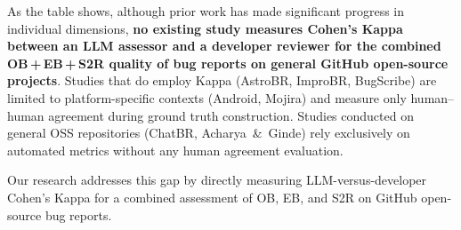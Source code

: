 As the table shows, although prior work has made significant progress
in individual dimensions, \textbf{no existing study measures Cohen's
Kappa between an LLM assessor and a developer reviewer for the
combined OB\,+\,EB\,+\,S2R quality of bug reports on general GitHub
open-source projects}.  Studies that do employ Kappa (AstroBR,
ImproBR, BugScribe) are limited to platform-specific contexts
(Android, Mojira) and measure only human--human agreement during
ground truth construction.  Studies conducted on general OSS
repositories (ChatBR, Acharya~\&~Ginde) rely exclusively on
automated metrics without any human agreement evaluation.

Our research addresses this gap by directly measuring LLM-versus-developer
Cohen's Kappa for a combined assessment of OB, EB, and S2R on
GitHub open-source bug reports.

